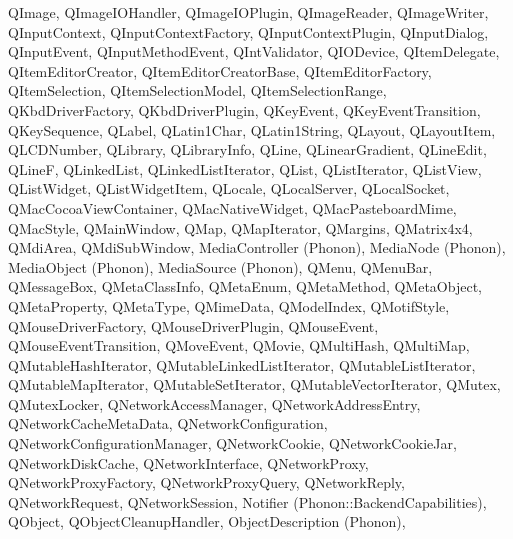{{        QImage,
        QImageIOHandler,
        QImageIOPlugin,
        QImageReader,
        QImageWriter,
        QInputContext,
        QInputContextFactory,
        QInputContextPlugin,
        QInputDialog,
        QInputEvent,
        QInputMethodEvent,
        QIntValidator,
        QIODevice,
        QItemDelegate,
        QItemEditorCreator,
        QItemEditorCreatorBase,
        QItemEditorFactory,
        QItemSelection,
        QItemSelectionModel,
        QItemSelectionRange,
        QKbdDriverFactory,
        QKbdDriverPlugin,
        QKeyEvent,
        QKeyEventTransition,
        QKeySequence,
        QLabel,
        QLatin1Char,
        QLatin1String,
        QLayout,
        QLayoutItem,
        QLCDNumber,
        QLibrary,
        QLibraryInfo,
        QLine,
        QLinearGradient,
        QLineEdit,
        QLineF,
        QLinkedList,
        QLinkedListIterator,
        QList,
        QListIterator,
        QListView,
        QListWidget,
        QListWidgetItem,
        QLocale,
        QLocalServer,
        QLocalSocket,
        QMacCocoaViewContainer,
        QMacNativeWidget,
        QMacPasteboardMime,
        QMacStyle,
        QMainWindow,
        QMap,
        QMapIterator,
        QMargins,
        QMatrix4x4,
        QMdiArea,
        QMdiSubWindow,
        MediaController (Phonon),
        MediaNode (Phonon),
        MediaObject (Phonon),
        MediaSource (Phonon),
        QMenu,
        QMenuBar,
        QMessageBox,
        QMetaClassInfo,
        QMetaEnum,
        QMetaMethod,
        QMetaObject,
        QMetaProperty,
        QMetaType,
        QMimeData,
        QModelIndex,
        QMotifStyle,
        QMouseDriverFactory,
        QMouseDriverPlugin,
        QMouseEvent,
        QMouseEventTransition,
        QMoveEvent,
        QMovie,
        QMultiHash,
        QMultiMap,
        QMutableHashIterator,
        QMutableLinkedListIterator,
        QMutableListIterator,
        QMutableMapIterator,
        QMutableSetIterator,
        QMutableVectorIterator,
        QMutex,
        QMutexLocker,
        QNetworkAccessManager,
        QNetworkAddressEntry,
        QNetworkCacheMetaData,
        QNetworkConfiguration,
        QNetworkConfigurationManager,
        QNetworkCookie,
        QNetworkCookieJar,
        QNetworkDiskCache,
        QNetworkInterface,
        QNetworkProxy,
        QNetworkProxyFactory,
        QNetworkProxyQuery,
        QNetworkReply,
        QNetworkRequest,
        QNetworkSession,
        Notifier (Phonon::BackendCapabilities),
        QObject,
        QObjectCleanupHandler,
        ObjectDescription (Phonon),
}}
